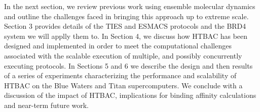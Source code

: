 In the next section, we review previous work using ensemble molecular dynamics
and outline the challenges faced in bringing this approach up to extreme
scale. Section 3 provides details of the TIES and ESMACS protocols and the
BRD4 system we will applly them to. In Section 4, we discuss how HTBAC has
been designed and implemented in order to meet the computational challenges
associated with the scalable execution of multiple, and possibly concurrently
executing protocols. In Sections 5 and 6 we describe the design and then
results of a series of experiments characterizing the performance and
scalability of HTBAC on the Blue Waters and Titan supercomputers. We conclude
with a discussion of the impact of HTBAC, implications for binding affinity
calculations and near-term future work.
